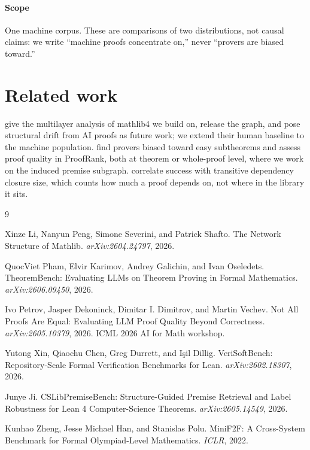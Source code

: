 \documentclass{article}
\begin{document}
\paragraph{Scope}
One machine corpus. These are comparisons of two distributions, not causal
claims: we write ``machine proofs concentrate on,'' never ``provers are biased
toward.''

\section{Related work}\label{rel}

\citet{li2026network} give the multilayer analysis of mathlib4 we build on,
release the graph, and pose structural drift from AI proofs as future work; we
extend their human baseline to the machine population. \citet{theorembench} find
provers biased toward easy subtheorems and \citet{proofrank} assess proof quality
in ProofRank, both at theorem or whole-proof level, where we work on the induced
premise subgraph. \citet{verisoftbench} correlate success with transitive
dependency closure size, which counts how much a proof depends on, not where in
the library it sits.\label{repro}

\label{bibstart}
\small

\begin{thebibliography}{9}

Xinze Li, Nanyun Peng, Simone Severini, and Patrick Shafto.
\newblock The Network Structure of Mathlib.
\newblock \emph{arXiv:2604.24797}, 2026.

QuocViet Pham, Elvir Karimov, Andrey Galichin, and Ivan Oseledets.
\newblock TheoremBench: Evaluating LLMs on Theorem Proving in Formal
Mathematics.
\newblock \emph{arXiv:2606.09450}, 2026.

Ivo Petrov, Jasper Dekoninck, Dimitar I. Dimitrov, and Martin Vechev.
\newblock Not All Proofs Are Equal: Evaluating LLM Proof Quality Beyond
Correctness.
\newblock \emph{arXiv:2605.10379}, 2026. ICML 2026 AI for Math workshop.

Yutong Xin, Qiaochu Chen, Greg Durrett, and I\c{s}il Dillig.
\newblock VeriSoftBench: Repository-Scale Formal Verification Benchmarks for
Lean.
\newblock \emph{arXiv:2602.18307}, 2026.

Junye Ji.
\newblock CSLibPremiseBench: Structure-Guided Premise Retrieval and Label
Robustness for Lean 4 Computer-Science Theorems.
\newblock \emph{arXiv:2605.14549}, 2026.

Kunhao Zheng, Jesse Michael Han, and Stanislas Polu.
\newblock MiniF2F: A Cross-System Benchmark for Formal Olympiad-Level
Mathematics.
\newblock \emph{ICLR}, 2022.

\end{thebibliography}
\end{document}
